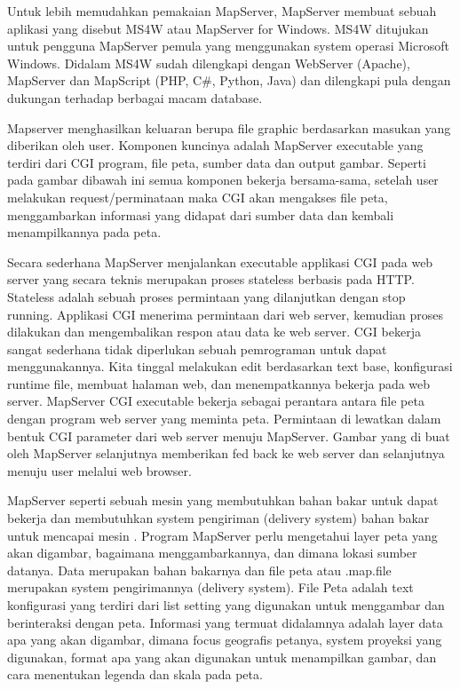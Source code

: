 Untuk lebih memudahkan pemakaian MapServer, MapServer membuat sebuah aplikasi yang disebut MS4W atau MapServer for Windows. MS4W ditujukan untuk pengguna MapServer pemula yang menggunakan system operasi Microsoft Windows. Didalam MS4W sudah dilengkapi dengan WebServer (Apache), MapServer dan MapScript (PHP, C#, Python, Java) dan dilengkapi pula dengan dukungan terhadap berbagai macam database.

Mapserver menghasilkan keluaran berupa file graphic berdasarkan masukan yang diberikan oleh user. 
Komponen kuncinya adalah MapServer executable yang terdiri dari CGI program, file peta, sumber data dan output gambar. 
Seperti pada gambar dibawah ini semua komponen bekerja bersama-sama, 
setelah user melakukan request/perminataan maka CGI akan mengakses file peta, 
menggambarkan informasi yang didapat dari sumber data dan kembali menampilkannya pada peta.

Secara sederhana MapServer menjalankan executable applikasi CGI pada web server yang secara teknis merupakan 
proses stateless berbasis pada HTTP. Stateless adalah sebuah proses permintaan yang dilanjutkan dengan stop running. 
Applikasi CGI menerima permintaan dari web server, kemudian proses dilakukan dan mengembalikan respon atau data ke web server.
CGI bekerja sangat sederhana tidak diperlukan sebuah pemrograman untuk dapat menggunakannya. 
Kita tinggal melakukan edit berdasarkan text base, konfigurasi runtime file, membuat halaman web, 
dan menempatkannya bekerja pada web server. MapServer CGI executable bekerja sebagai perantara antara file peta 
dengan program web server yang meminta peta. Permintaan di lewatkan dalam bentuk CGI parameter dari web server menuju MapServer.
Gambar yang di buat oleh MapServer selanjutnya memberikan fed back ke web server dan selanjutnya menuju 
user melalui web browser.

MapServer seperti sebuah mesin yang membutuhkan bahan bakar untuk dapat bekerja dan membutuhkan system pengiriman (delivery system) bahan bakar untuk mencapai mesin . Program MapServer perlu mengetahui layer peta yang akan digambar, bagaimana menggambarkannya, dan dimana lokasi sumber datanya. Data merupakan bahan bakarnya dan file peta atau .map.file merupakan system pengirimannya (delivery system). File Peta adalah text konfigurasi yang terdiri dari list setting yang digunakan untuk menggambar dan berinteraksi dengan peta. Informasi yang termuat didalamnya adalah layer data apa yang akan digambar, dimana focus geografis petanya, system proyeksi yang digunakan, format apa yang akan digunakan untuk menampilkan gambar, dan cara menentukan legenda dan skala pada peta.


